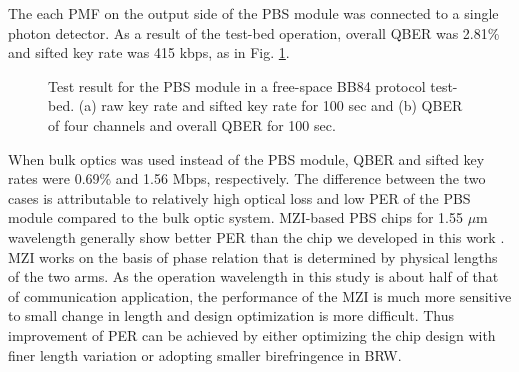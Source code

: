 \documentclass[letterpaper, 10pt]{article}
\begin{document}
The each PMF on the output side of the PBS module was connected to a single photon detector.
As a result of the test-bed operation, overall QBER was 2.81\% and sifted key rate was 415 kbps, as in Fig. \ref{fig:QKD_result}.
\begin{figure}[ht]
  \centering
  \caption{Test result for the PBS module in a free-space BB84 protocol test-bed. (a) raw key rate and sifted key rate for 100 sec and (b) QBER of four channels and overall QBER for 100 sec.}
  \label{fig:QKD_result}
\end{figure}
When bulk optics was used instead of the PBS module, QBER and sifted key rates were 0.69\% and 1.56 Mbps, respectively.
The difference between the two cases is attributable to relatively high optical loss and low PER of the PBS module compared to the bulk optic system.
MZI-based PBS chips for 1.55 $\mu$m wavelength generally show better PER than the chip we developed in this work \cite{Hashizume:2015ta}.
MZI works on the basis of phase relation that is determined by physical lengths of the two arms.
As the operation wavelength in this study is about half of that of communication application, the performance of the MZI is much more sensitive to small change in length and design optimization is more difficult.
Thus improvement of PER can be achieved by either optimizing the chip design with finer length variation or adopting smaller birefringence in BRW.
\end{document}
